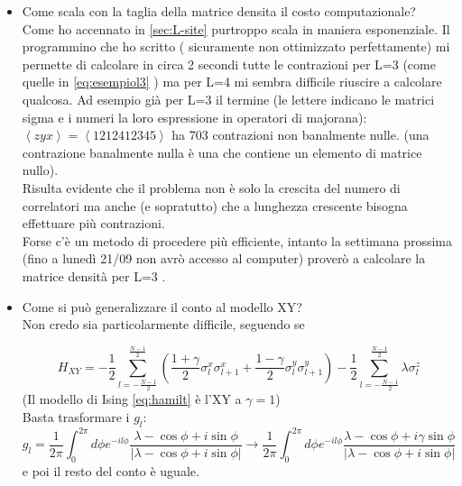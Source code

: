 \documentclass[10pt,a4paper]{article}
\begin{document}
\begin{itemize}
\item Come scala con la taglia della matrice densita il costo computazionale?\\
Come ho accennato in \ref{sec:L-site} purtroppo scala in maniera esponenziale. Il programmino che ho scritto ( sicuramente non ottimizzato perfettamente) mi permette di calcolare in circa 2 secondi tutte le contrazioni per L=3 (come quelle in  \ref{eq:esempiol3} ) ma per L=4 mi sembra difficile riuscire a calcolare qualcosa.
Ad esempio già per L=3 il termine (le lettere indicano le matrici sigma e i numeri la loro espressione in operatori di majorana): $\left\langle zyx\right\rangle=\left\langle1212412345\right\rangle$ 
ha 703 contrazioni non banalmente nulle. (una contrazione banalmente nulla è una che contiene un elemento di matrice nullo).\\
Risulta evidente che il  problema non è solo la crescita del numero di correlatori ma anche (e sopratutto) che a lunghezza crescente bisogna effettuare più contrazioni.\\
Forse c'è un metodo di procedere più efficiente, intanto la settimana prossima (fino a lunedì 21/09 non avrò accesso al computer) proverò a calcolare la matrice densità per L=3 .

\item Come si può generalizzare il conto al modello XY?\\
Non credo sia particolarmente difficile, seguendo \cite{latorre2003ground} se 

\begin{equation}
		H_{X Y} =-\frac{1}{2} \sum_{l=-\frac{N-1}{2}}^{\frac{N-1}{2}}\left(\frac{1+\gamma}{2} \sigma_{l}^{x} \sigma_{l+1}^{x}+\frac{1-\gamma}{2} \sigma_{l}^{y} \sigma_{l+1}^{y}\right)
		-\frac{1}{2} \sum_{l=-\frac{N-1}{2}}^{\frac{N-1}{2}} \lambda \sigma_{l}^{z}
\end{equation}
(Il modello di Ising \ref{eq:hamilt} è l'XY a $\gamma=1$)\\
Basta trasformare i $g_l$:
\begin{equation}
g_{l}=\frac{1}{2 \pi} \int_{0}^{2 \pi} d \phi e^{-i l \phi} \frac{\lambda-\cos \phi+i \sin \phi}{|\lambda-\cos\phi +i  \sin \phi|} \rightarrow \frac{1}{2 \pi} \int_{0}^{2 \pi} d \phi e^{-i l \phi} \frac{\lambda-\cos \phi+i \gamma \sin \phi}{|\lambda-\cos\phi +i  \sin \phi|}
\end{equation}
e poi il resto del conto è uguale.

\end{itemize}
\clearpage
\end{document}
